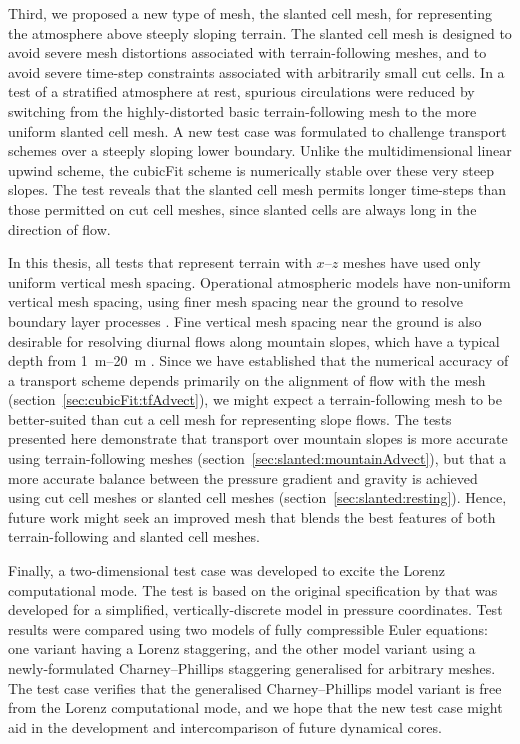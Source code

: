 Third, we proposed a new type of mesh, the slanted cell mesh, for representing the atmosphere above steeply sloping terrain.
The slanted cell mesh is designed to avoid severe mesh distortions associated with terrain-following meshes, and to avoid severe time-step constraints associated with arbitrarily small cut cells.
In a test of a stratified atmosphere at rest, spurious circulations were reduced by switching from the highly-distorted basic terrain-following mesh to the more uniform slanted cell mesh.
A new test case was formulated to challenge transport schemes over a steeply sloping lower boundary.
Unlike the multidimensional linear upwind scheme, the cubicFit scheme is numerically stable over these very steep slopes.
The test reveals that the slanted cell mesh permits longer time-steps than those permitted on cut cell meshes, since slanted cells are always long in the direction of flow.

In this thesis, all tests that represent terrain with $x$--$z$ meshes have used only uniform vertical mesh spacing.
Operational atmospheric models have non-uniform vertical mesh spacing, using finer mesh spacing near the ground to resolve boundary layer processes \citep[p. 547]{chow2013}.
Fine vertical mesh spacing near the ground is also desirable for resolving diurnal flows along mountain slopes, which have a typical depth from \SIrange{1}{20}{\meter} \citep[p. 39]{chow2013}.
Since we have established that the numerical accuracy of a transport scheme depends primarily on the alignment of flow with the mesh (section~\ref{sec:cubicFit:tfAdvect}), we might expect a terrain-following mesh to be better-suited than cut a cell mesh for representing slope flows.
The tests presented here demonstrate that transport over mountain slopes is more accurate using terrain-following meshes (section~\ref{sec:slanted:mountainAdvect}), but that a more accurate balance between the pressure gradient and gravity is achieved using cut cell meshes or slanted cell meshes (section~\ref{sec:slanted:resting}).
Hence, future work might seek an improved mesh that blends the best features of both terrain-following and slanted cell meshes.

Finally, a two-dimensional test case was developed to excite the Lorenz computational mode.
The test is based on the original specification by \citet{arakawa-konor1996} that was developed for a simplified, vertically-discrete model in pressure coordinates.
Test results were compared using two models of fully compressible Euler equations: one variant having a Lorenz staggering, and the other model variant using a newly-formulated Charney--Phillips staggering generalised for arbitrary meshes.
The test case verifies that the generalised Charney--Phillips model variant is free from the Lorenz computational mode, and we hope that the new test case might aid in the development and intercomparison of future dynamical cores.

